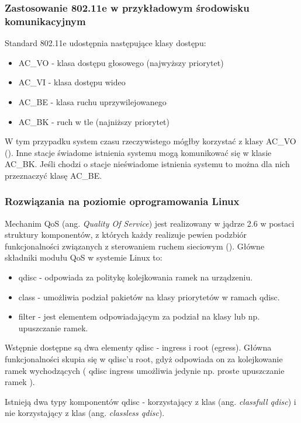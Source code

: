 \subsubsection{Zastosowanie 802.11e w przykładowym środowisku komunikacyjnym}

Standard 802.11e udostępnia następujące klasy dostępu:

\begin{itemize}
\item AC\_VO - klasa dostępu głosowego (najwyższy priorytet)
\item AC\_VI - klasa dostępu wideo
\item AC\_BE - klasa ruchu uprzywilejowanego 
\item AC\_BK - ruch w tle (najniższy priorytet)
\end{itemize}

W tym przypadku system czasu rzeczywistego mógłby korzystać z klasy AC\_VO (\cite{pub:802.11e}). Inne stacje świadome istnienia systemu mogą komunikować się w klasie AC\_BK. Jeśli chodzi o stacje nieświadome istnienia systemu to można dla nich przeznaczyć klasę AC\_BE.

\subsubsection{Rozwiązania na poziomie oprogramowania Linux}

Mechanim QoS (ang. \emph{Quality Of Service}) jest realizowany w jądrze 2.6 w postaci struktury komponentów, z których każdy realizuje pewien podzbiór funkcjonalności związanych z sterowaniem ruchem sieciowym (\cite{pub:QoS}). Główne składniki modułu QoS w systemie Linux to:

\begin{itemize}
\item qdisc - odpowiada za politykę kolejkowania ramek na urządzeniu.
\item class - umożliwia podział pakietów na klasy priorytetów w ramach qdisc.
\item filter - jest elementem odpowiadającym za podział na klasy lub np. upuszczanie ramek.
\end{itemize}

Wstępnie dostępne są dwa elementy qdisc - ingress i root (egress). Główna funkcjonalności skupia się w qdisc'u root, gdyż odpowiada on za kolejkowanie ramek wychodzących ( qdisc ingress umożliwia jedynie np. proste upuszczanie ramek ).

Istnieją dwa typy komponentów qdisc - korzystający z klas (ang. \emph{classfull qdisc}) i nie korzystający z klas (ang. \emph{classless qdisc}). 

